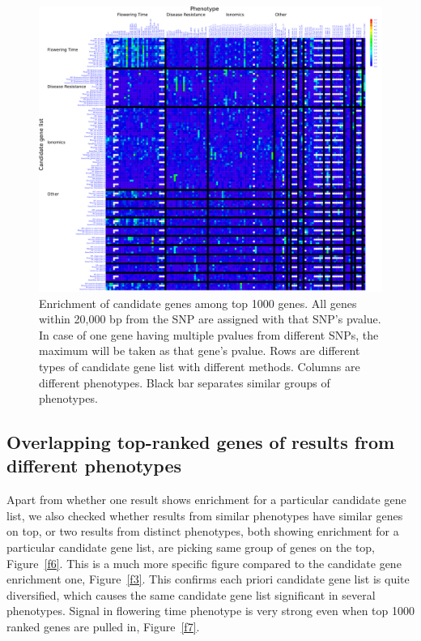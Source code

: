 \documentclass[a4paper,10pt]{article}
\begin{document}
\begin{figure}
  \includegraphics[width=1\textwidth]{figures/top_snp_test_call_method_17_f1000_m20000_inkscape.png}
  \caption{Enrichment of candidate genes among top 1000 genes. All genes within 20,000 bp from the SNP are assigned with that SNP's pvalue. In case of one gene having multiple pvalues from different SNPs, the maximum will be taken as that gene's pvalue. Rows are different types of candidate gene list with different methods. Columns are different phenotypes. Black bar separates similar groups of phenotypes.}\label{f5}
\end{figure}

\subsection{Overlapping top-ranked genes of results from different phenotypes}
Apart from whether one result shows enrichment for a particular candidate gene list, we also checked whether results from similar phenotypes have similar genes on top, or two results from distinct phenotypes, both showing enrichment for a particular candidate gene list, are picking same group of genes on the top, Figure~\ref{f6}. This is a much more specific figure compared to the candidate gene enrichment one, Figure~\ref{f3}. This confirms each priori candidate gene list is quite diversified, which causes the same candidate gene list significant in several phenotypes. Signal in flowering time phenotype is very strong even when top 1000 ranked genes are pulled in, Figure~\ref{f7}.
\end{document}
